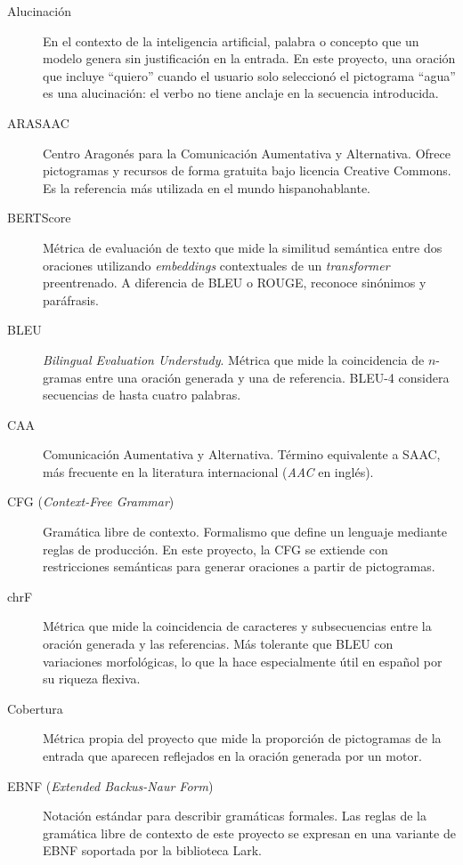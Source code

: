 \begin{description}
    \item[Alucinación] En el contexto de la inteligencia artificial, palabra o concepto que un modelo genera sin justificación en la entrada. En este proyecto, una oración que incluye ``quiero'' cuando el usuario solo seleccionó el pictograma ``agua'' es una alucinación: el verbo no tiene anclaje en la secuencia introducida.

    \item[ARASAAC] Centro Aragonés para la Comunicación Aumentativa y Alternativa. Ofrece pictogramas y recursos de forma gratuita bajo licencia Creative Commons. Es la referencia más utilizada en el mundo hispanohablante.

    \item[BERTScore] Métrica de evaluación de texto que mide la similitud semántica entre dos oraciones utilizando \textit{embeddings} contextuales de un \textit{transformer} preentrenado. A diferencia de BLEU o ROUGE, reconoce sinónimos y paráfrasis.

    \item[BLEU] \textit{Bilingual Evaluation Understudy}. Métrica que mide la coincidencia de $n$-gramas entre una oración generada y una de referencia. BLEU-4 considera secuencias de hasta cuatro palabras.

    \item[CAA] Comunicación Aumentativa y Alternativa. Término equivalente a SAAC, más frecuente en la literatura internacional (\textit{AAC} en inglés).

    \item[CFG (\textit{Context-Free Grammar})] Gramática libre de contexto. Formalismo que define un lenguaje mediante reglas de producción. En este proyecto, la CFG se extiende con restricciones semánticas para generar oraciones a partir de pictogramas.

    \item[chrF] Métrica que mide la coincidencia de caracteres y subsecuencias entre la oración generada y las referencias. Más tolerante que BLEU con variaciones morfológicas, lo que la hace especialmente útil en español por su riqueza flexiva.

    \item[Cobertura] Métrica propia del proyecto que mide la proporción de pictogramas de la entrada que aparecen reflejados en la oración generada por un motor.

    \item[EBNF (\textit{Extended Backus-Naur Form})] Notación estándar para describir gramáticas formales. Las reglas de la gramática libre de contexto de este proyecto se expresan en una variante de EBNF soportada por la biblioteca Lark.


\end{description}

